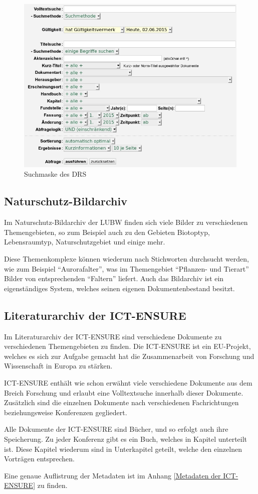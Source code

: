 \begin{figure}[!ht]
\centering
\includegraphics[width=15cm]{Bilder/Suchmaske_DRS.jpg}
\caption{Suchmaske des \ac{DRS}}
\label{Suchmaske DRS}
\centering
\end{figure}

\subsection{Naturschutz-Bildarchiv} \label{Bilddatenbank}
Im Naturschutz-Bildarchiv der \ac{LUBW} finden sich viele Bilder zu verschiedenen Themengebieten, so zum Beispiel auch zu den Gebieten Biotoptyp, Lebensraumtyp, Naturschutzgebiet und einige mehr.
\cite{Naturschutz-Bildarchiv}

Diese Themenkomplexe k\"onnen wiederum nach Stichworten durchsucht werden, wie zum Beispiel "`Aurorafalter"', was im Themengebiet "`Pflanzen- und Tierart"' Bilder von entsprechenden "`Faltern"' liefert. Auch das Bildarchiv ist ein eigenst\"andiges System, welches seinen eigenen Dokumentenbestand besitzt.

\subsection{Literaturarchiv der ICT-ENSURE}
Im Literaturarchiv der \ac{ICT-ENSURE} sind verschiedene Dokumente zu verschiedenen Themengebieten zu finden. Die \ac{ICT-ENSURE} ist ein EU-Projekt, welches es sich zur Aufgabe gemacht hat die Zusammenarbeit von Forschung und Wissenschaft in Europa zu st\"arken.

\ac{ICT-ENSURE} enth\"alt wie schon erw\"ahnt viele verschiedene Dokumente aus dem Breich Forschung und erlaubt eine Volltextsuche innerhalb dieser Dokumente. Zus\"atzlich sind die einzelnen Dokumente nach verschiedenen Fachrichtungen beziehungsweise Konferenzen gegliedert.
\cite{ICT-ENSURE_Bericht}

Alle Dokumente der \ac{ICT-ENSURE} sind B\"ucher, und so erfolgt auch ihre Speicherung.
Zu jeder Konferenz gibt es ein Buch, welches in Kapitel unterteilt ist. Diese Kapitel wiederum sind in Unterkapitel geteilt, welche den einzelnen Vortr\"agen entsprechen.

Eine genaue Auflistrung der Metadaten ist im Anhang \ref{Metadaten der ICT-ENSURE} zu finden.
